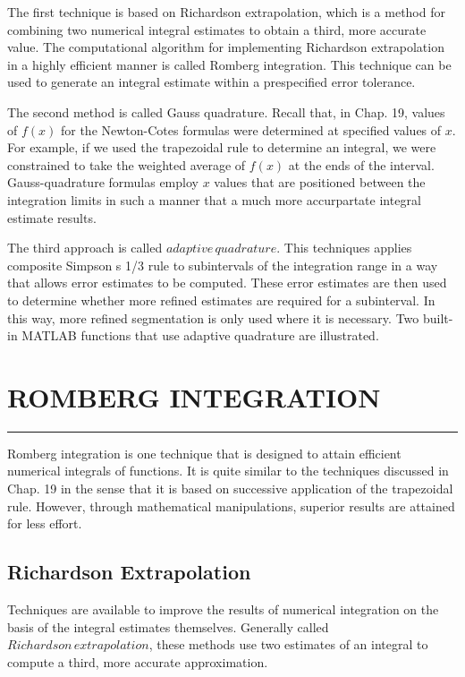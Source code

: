 \documentclass[../main.tex]{subfiles}
\begin{document}
The first technique is based on Richardson extrapolation, which is a method for
combining two numerical integral estimates to obtain a third, more accurate value. The
computational algorithm for implementing Richardson extrapolation in a highly efficient
manner is called Romberg integration. This technique can be used to generate an integral
estimate within a prespecified error tolerance.

The second method is called Gauss quadrature. Recall that, in Chap. 19, values of
$f (x)$ for the Newton-Cotes formulas were determined at specified values of $x$. For example, if we used the trapezoidal rule to determine an integral, we were constrained to take the
weighted average of $f (x)$ at the ends of the interval. Gauss-quadrature formulas employ $x$
values that are positioned between the integration limits in such a manner that a much more
accurpartate integral estimate results.

The third approach is called $adaptive\, quadrature$. This techniques applies composite
Simpson s 1/3 rule to subintervals of the integration range in a way that allows error estimates to be computed. These error estimates are then used to determine whether more
refined estimates are required for a subinterval. In this way, more refined segmentation
is only used where it is necessary. Two built-in MATLAB functions that use adaptive quadrature are illustrated.


\vspace{0,6in}
\section{ROMBERG INTEGRATION}
\vspace{0,1in}
\hrule
\vspace{0,1in}
Romberg integration is one technique that is designed to attain efficient numerical integrals
of functions. It is quite similar to the techniques discussed in Chap. 19 in the sense that it
is based on successive application of the trapezoidal rule. However, through mathematical
manipulations, superior results are attained for less effort.


\subsection{Richardson Extrapolation}
Techniques are available to improve the results of numerical integration on the basis of the
integral estimates themselves. Generally called $Richardson\, extrapolation$, these methods
use two estimates of an integral to compute a third, more accurate approximation.
\end{document}
